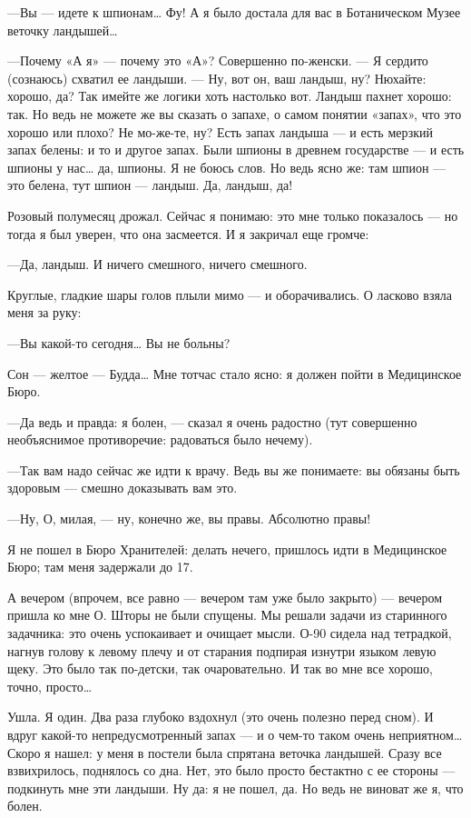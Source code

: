 \documentclass[11pt,openany]{book}
\begin{document}
---Вы --- идете к шпионам\ldots{} Фу! А я было достала для вас в Ботаническом Музее веточку ландышей\ldots{}

---Почему «А я» --- почему это «А»? Совершенно по-женски. --- Я сердито (сознаюсь) схватил ее ландыши. --- Ну, вот он, ваш ландыш, ну? Нюхайте: хорошо, да? Так имейте же логики хоть настолько вот. Ландыш пахнет хорошо: так. Но ведь не можете же вы сказать о запахе, о самом понятии «запах», что это хорошо или плохо? Не мо-же-те, ну? Есть запах ландыша --- и есть мерзкий запах белены: и то и другое запах. Были шпионы в древнем государстве --- и есть шпионы у нас\ldots{} да, шпионы. Я не боюсь слов. Но ведь ясно же: там шпион --- это белена, тут шпион --- ландыш. Да, ландыш, да!

Розовый полумесяц дрожал. Сейчас я понимаю: это мне только показалось --- но тогда я был уверен, что она засмеется. И я закричал еще громче:

---Да, ландыш. И ничего смешного, ничего смешного.

Круглые, гладкие шары голов плыли мимо --- и оборачивались. О ласково взяла меня за руку:

---Вы какой-то сегодня\ldots{} Вы не больны?

Сон --- желтое --- Будда\ldots{} Мне тотчас стало ясно: я должен пойти в Медицинское Бюро.

---Да ведь и правда: я болен, --- сказал я очень радостно (тут совершенно необъяснимое противоречие: радоваться было нечему).

---Так вам надо сейчас же идти к врачу. Ведь вы же понимаете: вы обязаны быть здоровым --- смешно доказывать вам это.

---Ну, О, милая, --- ну, конечно же, вы правы. Абсолютно правы!

Я не пошел в Бюро Хранителей: делать нечего, пришлось идти в Медицинское Бюро; там меня задержали до 17.

А вечером (впрочем, все равно --- вечером там уже было закрыто) --- вечером пришла ко мне О. Шторы не были спущены. Мы решали задачи из старинного задачника: это очень успокаивает и очищает мысли. О-90 сидела над тетрадкой, нагнув голову к левому плечу и от старания подпирая изнутри языком левую щеку. Это было так по-детски, так очаровательно. И так во мне все хорошо, точно, просто\ldots{}

Ушла. Я один. Два раза глубоко вздохнул (это очень полезно перед сном). И вдруг какой-то непредусмотренный запах --- и о чем-то таком очень неприятном\ldots{} Скоро я нашел: у меня в постели была спрятана веточка ландышей. Сразу все взвихрилось, поднялось со дна. Нет, это было просто бестактно с ее стороны --- подкинуть мне эти ландыши. Ну да: я не пошел, да. Но ведь не виноват же я, что болен.
\end{document}
